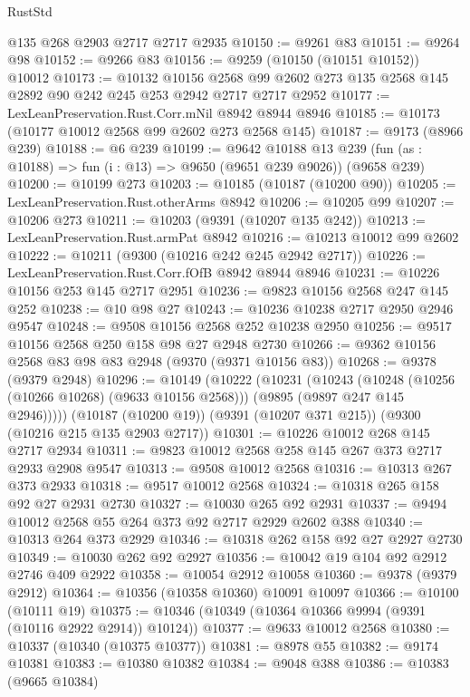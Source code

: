 \begin{lexlean}{RustStd}
\begin{coremodule}
    @135
    @268
    @2903
    @2717
    @2717
    @2935
@10150 := @9261 @83
@10151 := @9264 @98
@10152 := @9266 @83
@10156 := @9259 (@10150 (@10151 @10152)) @10012
@10173 := @10132
    @10156
    @2568
    @99
    @2602
    @273
    @135
    @2568
    @145
    @2892
    @90
    @242
    @245
    @253
    @2942
    @2717
    @2717
    @2952
@10177 := LexLeanPreservation.Rust.Corr.mNil @8942 @8944 @8946
@10185 := @10173 (@10177 @10012 @2568 @99 @2602 @273 @2568 @145)
@10187 := @9173 (@8966 @239)
@10188 := @6 @239
@10199 := @9642
    @10188
    @13
    @239
    (fun (as : @10188) => fun (i : @13) => @9650 (@9651 @239 @9026))
    (@9658 @239)
@10200 := @10199 @273
@10203 := @10185 (@10187 (@10200 @90))
@10205 := LexLeanPreservation.Rust.otherArms @8942
@10206 := @10205 @99
@10207 := @10206 @273
@10211 := @10203 (@9391 (@10207 @135 @242))
@10213 := LexLeanPreservation.Rust.armPat @8942
@10216 := @10213 @10012 @99 @2602
@10222 := @10211 (@9300 (@10216 @242 @245 @2942 @2717))
@10226 := LexLeanPreservation.Rust.Corr.fOfB @8942 @8944 @8946
@10231 := @10226 @10156 @253 @145 @2717 @2951
@10236 := @9823 @10156 @2568 @247 @145 @252
@10238 := @10 @98 @27
@10243 := @10236 @10238 @2717 @2950 @2946 @9547
@10248 := @9508 @10156 @2568 @252 @10238 @2950
@10256 := @9517 @10156 @2568 @250 @158 @98 @27 @2948 @2730
@10266 := @9362 @10156 @2568 @83 @98 @83 @2948 (@9370 (@9371 @10156 @83))
@10268 := @9378 (@9379 @2948)
@10296 := @10149
    (@10222
      (@10231
        (@10243
          (@10248 (@10256 (@10266 @10268) (@9633 @10156 @2568)))
          (@9895 (@9897 @247 @145 @2946)))))
    (@10187 (@10200 @19))
    (@9391 (@10207 @371 @215))
    (@9300 (@10216 @215 @135 @2903 @2717))
@10301 := @10226 @10012 @268 @145 @2717 @2934
@10311 := @9823 @10012 @2568 @258 @145 @267 @373 @2717 @2933 @2908 @9547
@10313 := @9508 @10012 @2568
@10316 := @10313 @267 @373 @2933
@10318 := @9517 @10012 @2568
@10324 := @10318 @265 @158 @92 @27 @2931 @2730
@10327 := @10030 @265 @92 @2931
@10337 := @9494 @10012 @2568 @55 @264 @373 @92 @2717 @2929 @2602 @388
@10340 := @10313 @264 @373 @2929
@10346 := @10318 @262 @158 @92 @27 @2927 @2730
@10349 := @10030 @262 @92 @2927
@10356 := @10042 @19 @104 @92 @2912 @2746 @409 @2922
@10358 := @10054 @2912 @10058
@10360 := @9378 (@9379 @2912)
@10364 := @10356 (@10358 @10360) @10091 @10097
@10366 := @10100 (@10111 @19)
@10375 := @10346 (@10349 (@10364 @10366 @9994 (@9391 (@10116 @2922 @2914)) @10124))
@10377 := @9633 @10012 @2568
@10380 := @10337 (@10340 (@10375 @10377))
@10381 := @8978 @55
@10382 := @9174 @10381
@10383 := @10380 @10382
@10384 := @9048 @388
@10386 := @10383 (@9665 @10384)

\end{coremodule}
\end{lexlean}
